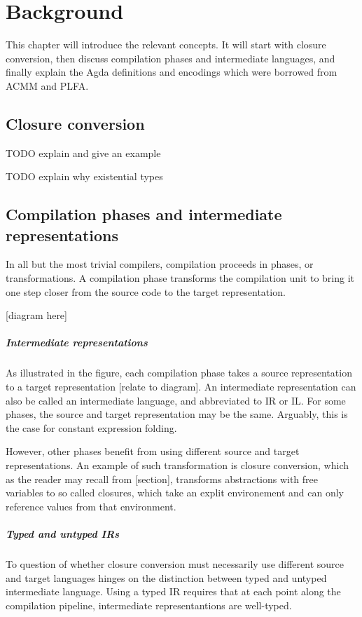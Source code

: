 \documentclass[bsc,frontabs,oneside,singlespacing,parskip,deptreport]{infthesis}
\theoremstyle{definition}
\begin{document}
\chapter{Background}

This chapter will introduce the relevant concepts. It will start with
closure conversion, then discuss compilation phases and intermediate
languages, and finally explain the Agda definitions and encodings
which were borrowed from ACMM and PLFA.

\section{Closure conversion}

TODO explain and give an example

TODO explain why existential types

\section{Compilation phases and intermediate representations}

In all but the most trivial compilers, compilation proceeds in
phases, or transformations. A compilation phase transforms the
compilation unit to bring it one step closer from the source code to
the target representation.

[diagram here]

\paragraph{Intermediate representations} As illustrated in the figure,
each compilation phase takes a source representation to a target
representation [relate to diagram]. An intermediate representation can
also be called an intermediate language, and abbreviated to IR or
IL. For some phases, the source and target representation may be the
same. Arguably, this is the case for constant expression folding.

However, other phases benefit from using different source and target
representations. An example of such transformation is closure
conversion, which as the reader may recall from [section], transforms
abstractions with free variables to so called closures, which take an
explit environement and can only reference values from that
environment.

\paragraph{Typed and untyped IRs} To question of whether closure
conversion must necessarily use different source and target languages
hinges on the distinction between typed and untyped intermediate
language. Using a typed IR requires that at each point along the
compilation pipeline, intermediate representantions are well-typed.
\end{document}

